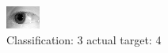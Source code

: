 \begin{figure}[h!]
\begin{center}
\includegraphics[width=0.60\columnwidth]{figures/ID1232_class_3_target_4.png}
\end{center}
\caption{ Classification: 3 actual target: 4}
\label{fig:ID1232_class_3_target_4}
\end{figure}
